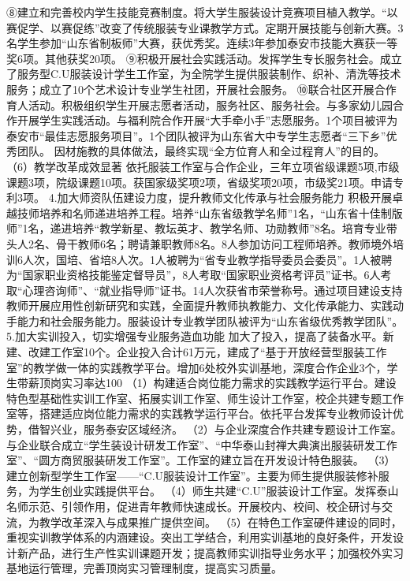 ⑧建立和完善校内学生技能竞赛制度。将大学生服装设计竞赛项目植入教学。“以赛促学、以赛促练”改变了传统服装专业课教学方式。定期开展技能与创新大赛。3名学生参加“山东省制板师”大赛，获优秀奖。连续3年参加泰安市技能大赛获一等奖6项。其他获奖20项。
⑨积极开展社会实践活动。发挥学生专长服务社会。成立了服务型C.U服装设计学生工作室，为全院学生提供服装制作、织补、清洗等技术服务；成立了10个艺术设计专业学生社团，开展社会服务。
⑩联合社区开展合作育人活动。积极组织学生开展志愿者活动，服务社区、服务社会。与多家幼儿园合作开展学生实践活动。与福利院合作开展“大手牵小手”志愿服务。1个项目被评为泰安市“最佳志愿服务项目”。1个团队被评为山东省大中专学生志愿者“三下乡”优秀团队。
因材施教的具体做法，最终实现“全方位育人和全过程育人”的目的。
（6）教学改革成效显著
依托服装工作室与合作企业，三年立项省级课题5项,市级课题3项，院级课题10项。获国家级奖项2项，省级奖项20项，市级奖21项。申请专利3项。
4.加大师资队伍建设力度，提升教师文化传承与社会服务能力
积极开展卓越技师培养和名师递进培养工程。培养“山东省级教学名师”1名，“山东省十佳制版师”1名，递进培养“教学新星、教坛英才、教学名师、功勋教师”8名。培育专业带头人2名、骨干教师6名；聘请兼职教师8名。8人参加访问工程师培养。教师境外培训6人次，国培、省培8人次。1人被聘为“省专业教学指导委员会委员”。1人被聘为“国家职业资格技能鉴定督导员”，8人考取“国家职业资格考评员”证书。6人考取“心理咨询师”、“就业指导师”证书。14人次获省市荣誉称号。通过项目建设支持教师开展应用性创新研究和实践，全面提升教师执教能力、文化传承能力、实践动手能力和社会服务能力。服装设计专业教学团队被评为“山东省级优秀教学团队”。
5.加大实训投入，切实增强专业服务造血功能
加大了投入，提高了装备水平。新建、改建工作室10个。企业投入合计61万元，建成了“基于开放经营型服装工作室”的教学做一体的实践教学平台。增加6处校外实训基地，深度合作企业3个，学生带薪顶岗实习率达100%
（1）构建适合岗位能力需求的实践教学运行平台。建设特色型基础性实训工作室、拓展实训工作室、师生设计工作室，校企共建专题工作室等，搭建适应岗位能力需求的实践教学运行平台。依托平台发挥专业教师设计优势，借智兴业，服务泰安区域经济。
（2）与企业深度合作共建专题设计工作室。与企业联合成立“学生装设计研发工作室”、“中华泰山封禅大典演出服装研发工作室”、“圆方商贸服装研发工作室”。工作室的建立旨在开发设计特色服装。
（3）建立创新型学生工作室——“C.U服装设计工作室”。主要为师生提供服装修补服务，为学生创业实践提供平台。
（4）师生共建“C.U”服装设计工作室。发挥泰山名师示范、引领作用，促进青年教师快速成长。开展校内、校间、校企研讨与交流，为教学改革深入与成果推广提供空间。
（5）在特色工作室硬件建设的同时，重视实训教学体系的内涵建设。突出工学结合，利用实训基地的良好条件，开发设计新产品，进行生产性实训课题开发；提高教师实训指导业务水平；加强校外实习基地运行管理，完善顶岗实习管理制度，提高实习质量。
